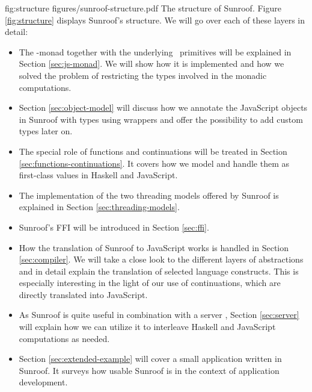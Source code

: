 \Figure%
{fig:structure}%
{figures/sunroof-structure.pdf}%
{The structure of Sunroof.}
Figure \ref{fig:structure} displays Sunroof's structure. 
We will go over each of these layers in detail:
\begin{itemize}
\item
The \JS-monad together with the underlying \JSI~primitives 
will be explained in Section \ref{sec:js-monad}. 
We will show how it is implemented and how we solved
the problem of restricting the types involved in the monadic 
computations.
\item
Section \ref{sec:object-model} will discuss how we annotate 
the JavaScript objects in Sunroof with types using wrappers 
and offer the possibility to add custom types later on.
\item
The special role of functions and continuations will
be treated in Section \ref{sec:functions-continuations}. 
It covers how we model and handle
them as first-class values in Haskell and JavaScript.
\item
The implementation of the two threading models offered by Sunroof is explained 
in Section \ref{sec:threading-models}.
\item
Sunroof's FFI will be introduced in Section \ref{sec:ffi}.
\item
How the translation of Sunroof to JavaScript works is handled in 
Section \ref{sec:compiler}. We will take a close look to the
different layers of abstractions and in detail explain the 
translation of selected language constructs. This is 
especially interesting in the light of our use of continuations, which
are directly translated into JavaScript.
\item
As Sunroof is quite useful in combination with a server \cite{Farmer:12:WebDSLs},
Section \ref{sec:server} will explain how we can utilize it 
to interleave Haskell and JavaScript computations as needed.
\item
Section \ref{sec:extended-example} will cover a small application 
written in Sunroof. 
It surveys how usable Sunroof is in the context of application development. 
\end{itemize}

